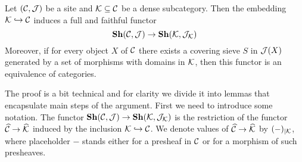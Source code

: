 \begin{theorem}\label{theorem:densesubcategoriesandsheaves}
Let $\left({\mathcal C},{\mathcal J}\right)$ be a site and ${\mathcal K}\subseteq {\mathcal C}$ be a dense subcategory. Then the embedding ${\mathcal K} \hookrightarrow {\mathcal C}$ induces a full and faithful functor
$$\mathbf{Sh}({\mathcal C},{\mathcal J})\rightarrow \mathbf{Sh}({\mathcal K},{\mathcal J}_{{\mathcal K}})$$
Moreover, if for every object $X$ of ${\mathcal C}$ there exists a covering sieve $S$ in ${\mathcal J}(X)$ generated by a set of morphisms with domains in ${\mathcal K}$, then this functor is an equivalence of categories.
\end{theorem}
\noindent
The proof is a bit technical and for clarity we divide it into lemmas that encapsulate main steps of the argument. First we need to introduce some notation. The functor $\mathbf{Sh}({\mathcal C},{\mathcal J})\rightarrow \mathbf{Sh}({\mathcal K},{\mathcal J}_{{\mathcal K}})$ is the restriction of the functor $\widehat{{\mathcal C}}\rightarrow \widehat{{\mathcal K}}$ induced by the inclusion ${\mathcal K}\hookrightarrow {\mathcal C}$. We denote values of $\widehat{{\mathcal C}}\rightarrow \widehat{{\mathcal K}}$ by $(-)_{\mid {\mathcal K}}$, where placeholder $-$ stands either for a presheaf in ${\mathcal C}$ or for a morphism of such presheaves.

